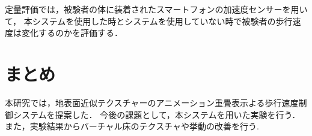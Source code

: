 \documentclass[dvipdfmx]{jsarticle}
\begin{document}
 定量評価では，被験者の体に装着されたスマートフォンの加速度センサーを用いて，
 本システムを使用した時とシステムを使用していない時で被験者の歩行速度は変化するのかを評価する．

\section{まとめ}
本研究では，地表面近似テクスチャーのアニメーション重畳表示よる歩行速度制御システムを提案した．
今後の課題として，本システムを用いた実験を行う．
また，実験結果からバーチャル床のテクスチャや挙動の改善を行う.


\end{document}
